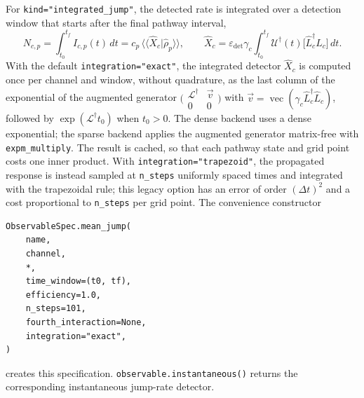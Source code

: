 \documentclass[11pt]{article}
\begin{document}
For \texttt{kind="integrated\_jump"}, the detected rate is integrated over a detection window that starts after the final pathway interval,
\begin{equation}
    N_{c,p}=\int_{t_0}^{t_f}I_{c,p}(t)\,dt
    =c_p\,\langle\!\langle \hat{X}_{c}|\hat{\rho}_p\rangle\!\rangle,
    \qquad
    \hat{X}_{c}=\varepsilon_{\mathrm{det}}\gamma_c\int_{t_0}^{t_f}\mathcal{U}^\dagger(t)\big[\hat{L}_c^\dagger\hat{L}_c\big]\,dt.
\end{equation}
With the default \texttt{integration="exact"}, the integrated detector $\hat{X}_c$ is computed once per channel and window, without quadrature, as the last column of the exponential of the augmented generator $\big(\begin{smallmatrix}\mathcal{L}^\dagger & \vec{v}\\ 0&0\end{smallmatrix}\big)$ with $\vec{v}=\operatorname{vec}(\gamma_c\hat{L}_c^\dagger\hat{L}_c)$, followed by $\exp(\mathcal{L}^\dagger t_0)$ when $t_0>0$. The dense backend uses a dense exponential; the sparse backend applies the augmented generator matrix-free with \texttt{expm\_multiply}. The result is cached, so that each pathway state and grid point costs one inner product. With \texttt{integration="trapezoid"}, the propagated response is instead sampled at \texttt{n\_steps} uniformly spaced times and integrated with the trapezoidal rule; this legacy option has an error of order $(\Delta t)^2$ and a cost proportional to \texttt{n\_steps} per grid point. The convenience constructor
\begin{verbatim}
ObservableSpec.mean_jump(
    name,
    channel,
    *,
    time_window=(t0, tf),
    efficiency=1.0,
    n_steps=101,
    fourth_interaction=None,
    integration="exact",
)
\end{verbatim}
creates this specification. \texttt{observable.instantaneous()} returns the corresponding instantaneous jump-rate detector.
\end{document}
